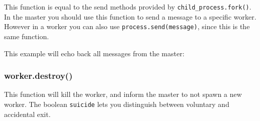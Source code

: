 This function is equal to the send methods provided by
\texttt{child\_process.fork()}. In the master you should use this
function to send a message to a specific worker. However in a worker you
can also use \texttt{process.send(message)}, since this is the same
function.

This example will echo back all messages from the master:

\begin{Shaded}
\begin{Highlighting}[]
 \NormalTok{(}\NormalTok{) \{}
   \NormalTok{();}
  \NormalTok{(}\NormalTok{);}

\NormalTok{\} }  \NormalTok{(}\NormalTok{) \{}
  \NormalTok{(}\NormalTok{, }
  \NormalTok{\});}
\NormalTok{\}}
\end{Highlighting}
\end{Shaded}

\subsubsection{worker.destroy()}

This function will kill the worker, and inform the master to not spawn a
new worker. The boolean \texttt{suicide} lets you distinguish between
voluntary and accidental exit.

\begin{Shaded}
\begin{Highlighting}[]
\NormalTok{(}\NormalTok{, }
   \NormalTok{(} \NormalTok{=== }\NormalTok{) \{}
    \NormalTok{(}
  \NormalTok{\}}
\NormalTok{\});}

\NormalTok{();}
\end{Highlighting}
\end{Shaded}

